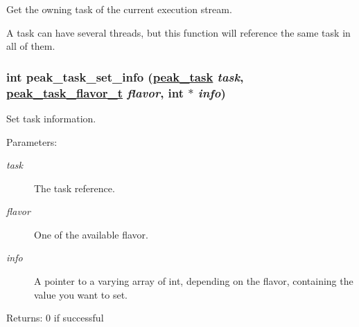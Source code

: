 Get the owning task of the current execution stream. 

A task can have several threads, but this function will reference the same task in all of them. \hypertarget{group__task__common_ga6}{
\subsubsection[peak\_\-task\_\-set\_\-info]{\setlength{\rightskip}{0pt plus 5cm}int peak\_\-task\_\-set\_\-info (\hyperlink{group__task__common_ga0}{peak\_\-task} {\em task}, \hyperlink{group__task__common_ga1}{peak\_\-task\_\-flavor\_\-t} {\em flavor}, int $\ast$ {\em info})}}
\label{group__task__common_ga6}


Set task information. 

\begin{Desc}
\item[Parameters:]
\begin{description}
\item[{\em task}]The task reference. \item[{\em flavor}]One of the available flavor. \item[{\em info}]A pointer to a varying array of int, depending on the flavor, containing the value you want to set.\end{description}
\end{Desc}
\begin{Desc}
\item[Returns:]0 if successful \end{Desc}
